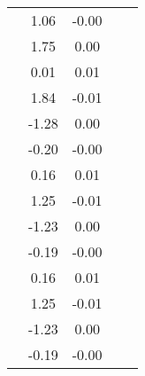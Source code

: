 \begin{table}
\begin{tabular}{c|cc|cc|}
\multicolumn{1}{|c|}{} & \multicolumn{1}{|c|}{      1.06} & \multicolumn{1}{|c|}{     -0.00} & \multicolumn{1}{|c|}{} & \multicolumn{1}{|c|}{} \\ 
\multicolumn{1}{|c|}{} & \multicolumn{1}{|c|}{      1.75} & \multicolumn{1}{|c|}{      0.00} & \multicolumn{1}{|c|}{} & \multicolumn{1}{|c|}{} \\ 
\multicolumn{1}{|c|}{} & \multicolumn{1}{|c|}{      0.01} & \multicolumn{1}{|c|}{      0.01} & \multicolumn{1}{|c|}{} & \multicolumn{1}{|c|}{} \\ 
\multicolumn{1}{|c|}{} & \multicolumn{1}{|c|}{      1.84} & \multicolumn{1}{|c|}{     -0.01} & \multicolumn{1}{|c|}{} & \multicolumn{1}{|c|}{} \\ 
\multicolumn{1}{|c|}{} & \multicolumn{1}{|c|}{     -1.28} & \multicolumn{1}{|c|}{      0.00} & \multicolumn{1}{|c|}{} & \multicolumn{1}{|c|}{} \\ 
\multicolumn{1}{|c|}{} & \multicolumn{1}{|c|}{     -0.20} & \multicolumn{1}{|c|}{     -0.00} & \multicolumn{1}{|c|}{} & \multicolumn{1}{|c|}{} \\ 
\multicolumn{1}{|c|}{} & \multicolumn{1}{|c|}{      0.16} & \multicolumn{1}{|c|}{      0.01} & \multicolumn{1}{|c|}{} & \multicolumn{1}{|c|}{} \\ 
\multicolumn{1}{|c|}{} & \multicolumn{1}{|c|}{      1.25} & \multicolumn{1}{|c|}{     -0.01} & \multicolumn{1}{|c|}{} & \multicolumn{1}{|c|}{} \\ 
\multicolumn{1}{|c|}{} & \multicolumn{1}{|c|}{     -1.23} & \multicolumn{1}{|c|}{      0.00} & \multicolumn{1}{|c|}{} & \multicolumn{1}{|c|}{} \\ 
\multicolumn{1}{|c|}{} & \multicolumn{1}{|c|}{     -0.19} & \multicolumn{1}{|c|}{     -0.00} & \multicolumn{1}{|c|}{} & \multicolumn{1}{|c|}{} \\ 
\multicolumn{1}{|c|}{} & \multicolumn{1}{|c|}{      0.16} & \multicolumn{1}{|c|}{      0.01} & \multicolumn{1}{|c|}{} & \multicolumn{1}{|c|}{} \\ 
\multicolumn{1}{|c|}{} & \multicolumn{1}{|c|}{      1.25} & \multicolumn{1}{|c|}{     -0.01} & \multicolumn{1}{|c|}{} & \multicolumn{1}{|c|}{} \\ 
\multicolumn{1}{|c|}{} & \multicolumn{1}{|c|}{     -1.23} & \multicolumn{1}{|c|}{      0.00} & \multicolumn{1}{|c|}{} & \multicolumn{1}{|c|}{} \\ 
\multicolumn{1}{|c|}{} & \multicolumn{1}{|c|}{     -0.19} & \multicolumn{1}{|c|}{     -0.00} & \multicolumn{1}{|c|}{} & \multicolumn{1}{|c|}{} \\ 

\end{tabular}
\end{table}
